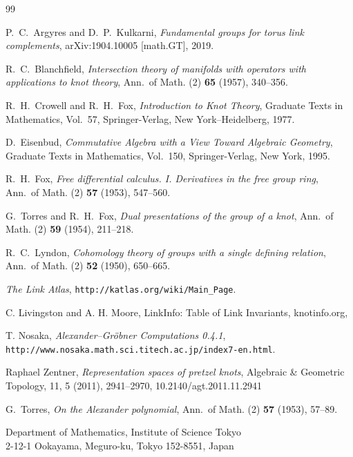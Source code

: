 \documentclass{article}
\theoremstyle{definition}
\theoremstyle{plain}
\begin{document}
\begin{thebibliography}{99}

P.~C.~Argyres and D.~P.~Kulkarni, 
\emph{Fundamental groups for torus link complements},
arXiv:1904.10005 [math.GT], 2019.

R.~C.~Blanchfield,
\emph{Intersection theory of manifolds with operators with applications to knot theory},
Ann.\ of Math. (2) \textbf{65} (1957), 340--356.

R.~H.~Crowell and R.~H.~Fox,
\emph{Introduction to Knot Theory},
Graduate Texts in Mathematics, Vol.~57,
Springer-Verlag, New York--Heidelberg, 1977.

D.~Eisenbud,
\emph{Commutative Algebra with a View Toward Algebraic Geometry},
Graduate Texts in Mathematics, Vol.~150,
Springer-Verlag, New York, 1995.

R.~H.~Fox,
\emph{Free differential calculus. I. Derivatives in the free group ring},
Ann.\ of Math. (2) \textbf{57} (1953), 547--560.

G.~Torres and R.~H.~Fox,
\emph{Dual presentations of the group of a knot},
Ann.\ of Math. (2) \textbf{59} (1954), 211--218.


R.~C.~Lyndon,
\emph{Cohomology theory of groups with a single defining relation},
Ann.\ of Math. (2) \textbf{52} (1950), 650--665.

\emph{The Link Atlas}, \texttt{http://katlas.org/wiki/Main\_Page}.



C. Livingston and A. H. Moore, LinkInfo: Table of Link Invariants, knotinfo.org, 

T. Nosaka, 
\emph{Alexander–Gröbner Computations 0.4.1}, \texttt{http://www.nosaka.math.sci.titech.ac.jp/index7-en.html}.


Raphael Zentner, \emph{
Representation spaces of pretzel knots},
Algebraic \& Geometric Topology, 11, 5 (2011), 
2941--2970, 10.2140/agt.2011.11.2941 

G.~Torres,
\emph{On the Alexander polynomial},
Ann.\ of Math. (2) \textbf{57} (1953), 57--89.

\end{thebibliography}

\noindent
Department of Mathematics, Institute of Science Tokyo \\
2-12-1 Ookayama, Meguro-ku, Tokyo 152-8551, Japan
\end{document}
